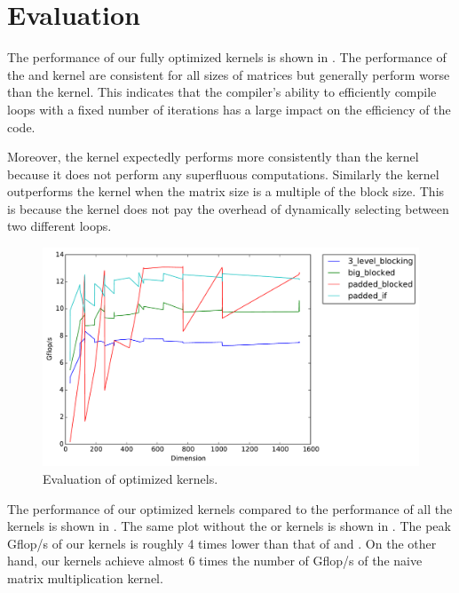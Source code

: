 \section{Evaluation}\label{sec:eval}
The performance of our fully optimized kernels is shown in . The
performance of the  and  kernel are
consistent for all sizes of matrices but generally perform worse than the
 kernel. This indicates that the compiler's ability to
efficiently compile loops with a fixed number of iterations has a large impact
on the efficiency of the code.

Moreover, the  kernel expectedly performs more consistently
than the  kernel because it does not perform any
superfluous computations. Similarly the  kernel
outperforms the  kernel when the matrix size is a multiple of
the block size. This is because the  kernel does not pay
the overhead of dynamically selecting between two different loops.

\begin{figure}[h]
  \centering
  \includegraphics[width=\textwidth]{img/timing_eval.pdf}
  \caption{Evaluation of optimized kernels.}
  \label{fig:eval}
\end{figure}

The performance of our optimized kernels compared to the performance of all the
kernels is shown in . The same plot without the  or
 kernels is shown in . The peak Gflop/s of
our kernels is roughly 4 times lower than that of  and . On
the other hand, our kernels achieve almost 6 times the number of Gflop/s of the
naive matrix multiplication kernel.

